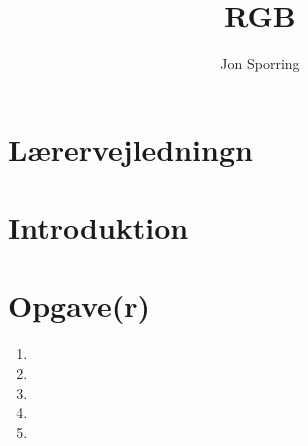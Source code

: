 \documentclass[a4paper,12pt]{article}
\title{RGB}
\author{Jon Sporring}
\begin{document}
\maketitle

\section{Lærervejledningn}

\section{Introduktion}

\section{Opgave(r)}
\begin{enumerate}
\item 
\item 
\item 
\item 
\item 
\end{enumerate}
\end{document}
